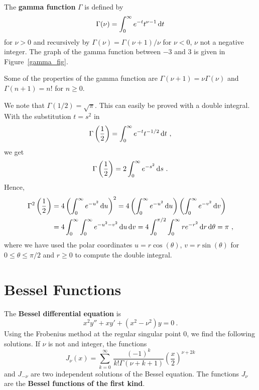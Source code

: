 The {\bfseries gamma function} $\Gamma$ is defined by
\[
\Gamma(\nu) = \int_0^\infty e^{-t} t^{\nu-1} \,\mathrm{d}{t}
\]
for $\nu > 0$ and recursively by
$\displaystyle \Gamma(\nu) = \Gamma(\nu + 1)/\nu$
for $\nu < 0$, $\nu$ not a negative integer.  The graph of the gamma
function between $-3$ and $3$ is given in Figure~\ref{gamma_fig}.

Some of the properties of the gamma function are
$\displaystyle \Gamma(\nu+1) = \nu \Gamma(\nu)$ and
$\displaystyle \Gamma(n+1) = n!$ for $n \geq 0$.


We note that $\Gamma(1/2) = \sqrt{\pi}$.  This can easily be proved
with a double integral.  With the substitution $t = s^2$ in
\[
\Gamma\left(\frac{1}{2}\right) = \int_0^\infty e^{-t} t^{-1/2} \,\mathrm{d}{t} \ ,
\]
we get
\[
\Gamma\left(\frac{1}{2}\right) = 2 \int_0^\infty e^{-s^2} \,\mathrm{d}{s} \ .
\]
Hence,
\begin{align*}
\Gamma^2\left(\frac{1}{2}\right)
&= 4 \left(\int_0^\infty e^{-u^2} \,\mathrm{d}{u}\right)^2
= 4 \left(\int_0^\infty e^{-u^2} \,\mathrm{d}{u}\right)
\left( \int_0^\infty e^{-v^2} \,\mathrm{d}{v}\right) \\
&= 4 \int_0^\infty \int_0^\infty e^{-u^2-v^2} \,\mathrm{d}{u} \,\mathrm{d}{v}
= 4 \int_0^{\pi/2} \int_0^\infty r e^{-r^2} \,\mathrm{d}{r}\,\mathrm{d}{\theta} = \pi \ ,
\end{align*}
where we have used the polar coordinates $u=r\cos(\theta)$,
$v=r\sin(\theta)$ for $0\leq \theta \leq \pi/2$ and $r\geq 0$ to
compute the double integral.

\section{Bessel Functions}

The {\bfseries Bessel differential equation} is 
\begin{equation} \label{spv_bess_equ}
x^2 y'' + x y' + (x^2 - \nu^2) y = 0 \ .
\end{equation}
Using the Frobenius method at the regular singular point $0$, we find
the following solutions.  If $\nu$ is not and integer, the functions
\[
J_\nu(x) = \sum_{k=0}^{\infty} \, \frac{(-1)^k}{k! \Gamma(\nu+k+1)}
\left(\frac{x}{2}\right)^{\nu+2k}
\]
and $J_{-\nu}$ are two independent solutions of the Bessel equation.
The functions $J_\nu$ are the {\bfseries Bessel functions of the first
kind}.

